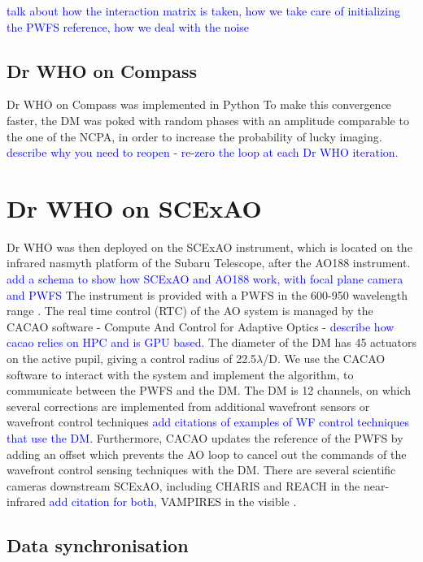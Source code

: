 \documentclass[twocolumn]{aastex62}
\begin{document}
\textcolor{blue}{talk about how the interaction matrix is taken, how we take care of initializing the PWFS reference, how we deal with the noise}
 

\subsection{Dr WHO on Compass}
Dr WHO on Compass was implemented in Python
To make this convergence faster, the DM was poked with random phases with an amplitude comparable to the one of the NCPA, in order to increase the probability of lucky imaging. \\

\textcolor{blue}{describe why you need to reopen - re-zero the loop at each Dr WHO iteration.}\\

\section{Dr WHO on SCExAO}

Dr WHO was then deployed on the SCExAO instrument, which is located on the infrared nasmyth platform of the Subaru Telescope, after the AO188 instrument. 
\textcolor{blue}{add a schema to show how SCExAO and AO188 work, with focal plane camera and PWFS}
The instrument is provided with a PWFS in the 600-950 wavelength range \citep{Lozi2019PWFS}. The real time control (RTC) of the AO system is managed by the CACAO software - Compute And Control for Adaptive Optics - \citep{cacao2018} \textcolor{blue}{describe how cacao relies on HPC and is GPU based}. The diameter of the DM has 45 actuators on the active pupil, giving a control radius of 22.5$\lambda$/D. We use the CACAO software to interact with the system and implement the algorithm, to communicate between the PWFS and the DM. The DM is 12 channels, on which several corrections are implemented from additional wavefront sensors or wavefront control techniques \textcolor{blue}{add citations of examples of WF control techniques that use the DM}. Furthermore, CACAO updates the reference of the PWFS by adding an offset which prevents the AO loop to cancel out the commands of the wavefront control sensing techniques with the DM. 
There are several scientific cameras downstream SCExAO, including CHARIS and REACH in the near-infrared \textcolor{blue}{add citation for both}, VAMPIRES in the visible \citep{vampires2015}. 


\subsection{Data synchronisation}
\end{document}
